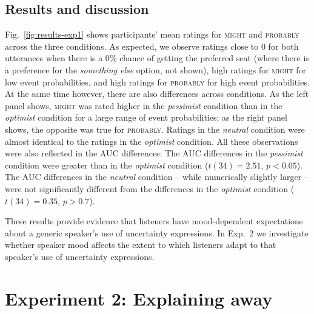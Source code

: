 \documentclass[man,floatsintext]{apa6}
\newcommand{\jd}[1]{\textcolor{Purple}{\bf [jd: #1]}}
\newcommand{\seb}[1]{\textcolor{Red}{\bf [Seb: #1]}}
\begin{document}
\subsection{Results and discussion}

Fig.~\ref{fig:results-exp1} shows participants' mean ratings for \textsc{might} and \textsc{probably} across the three conditions. As expected, we observe ratings close to 0 for both utterances when there is a 0\% chance of getting the preferred seat (where there is a preference for the \textit{something else} option, not shown), high ratings for \textsc{might} for low event probabilities, and high ratings for \textsc{probably} for high event probabilities. At the same time however, there are also differences across conditions. As the left panel shows, \textsc{might} was rated higher in the \textit{pessimist} condition than in the \textit{optimist} condition for a large range of event probabilities; as the right panel shows, the opposite was true for \textsc{probably}. Ratings in the \textit{neutral} condition were almost identical to the ratings in the \textit{optimist} condition. All these observations were also reflected in the AUC differences: The AUC differences in the \textit{pessimist} condition were greater than in the \textit{optimist} condition ($t(34)=2.51$, $p < 0.05$). The AUC differences in the \textit{neutral} condition -- while numerically slightly larger -- were not significantly different from the differences in the \textit{optimist} condition ($t(34)=0.35$, $p>0.7$).

These results provide evidence that listeners have mood-dependent expectations about a generic speaker's use of uncertainty expressions. In Exp.~2 we investigate whether  speaker mood affects the extent to which listeners adapt to that speaker's use of uncertainty expressions.  %



\section{Experiment 2: Explaining away}
\end{document}

